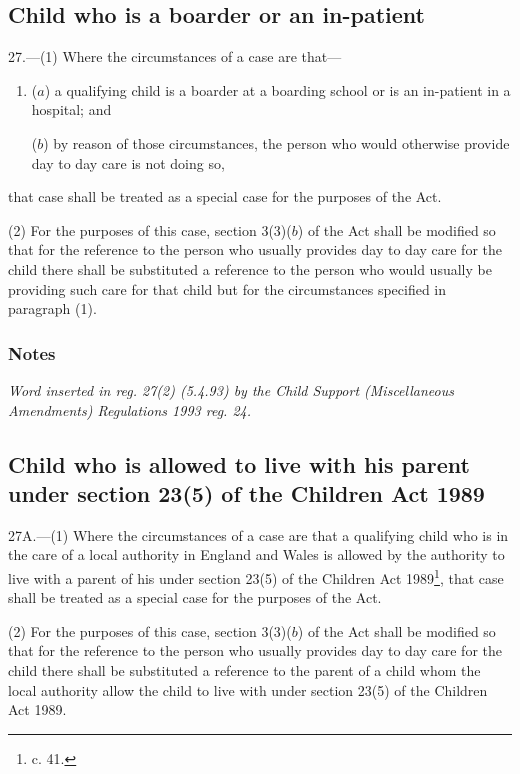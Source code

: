 \documentclass[a4paper]{article}
\newcommand\amendment[1]{\subsubsection*{Notes}{\itshape\frenchspacing\footnotesize #1 \par\goodbreak}}
\begin{document}
\subsection[27. Child who is a boarder or an in-patient]{Child who is a boarder or an in-patient}

27.—(1) Where the circumstances of a case are that—
\begin{enumerate}\item[]
($a$) a qualifying child is a boarder at a boarding school or is an in-patient in a hospital; and

($b$) by reason of those circumstances, the person who would otherwise provide day to day care is not doing so,
\end{enumerate}
that case shall be treated as a special case for the purposes of the Act.

(2) For the purposes of this case, section 3(3)($b$) of the Act shall be modified so 
that %
for the reference to the person who usually provides day to day care for the child there shall be substituted a reference to the person who would usually be providing such care for that child but for the circumstances specified in paragraph (1).

\amendment{
Word inserted in reg. 27(2) (5.4.93) by the Child Support (Miscellaneous Amendments) Regulations 1993 reg. 24.
}

\subsection[27A. Child who is allowed to live with his parent under section 23(5) of the Children Act 1989]{Child who is allowed to live with his parent under section 23(5) of the Children Act 1989}

27A.—(1) Where the circumstances of a case are that a qualifying child who is in the care of a local authority in England and Wales is allowed by the authority to live with a parent of his under section 23(5) of the Children Act 1989\footnote{ c. 41.}, that case shall be treated as a special case for the purposes of the Act.

(2) For the purposes of this case, section 3(3)($b$) of the Act shall be modified so that for the reference to the person who usually provides day to day care for the child there shall be substituted a reference to the parent of a child whom the local authority allow the child to live with under section 23(5) of the Children Act 1989.
\end{document}
